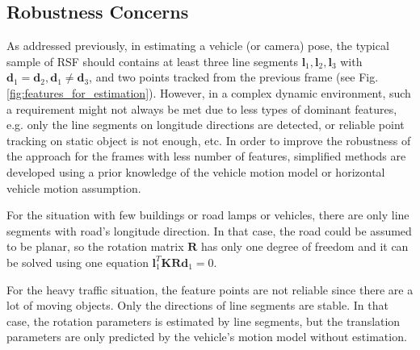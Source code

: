 \documentclass[letterpaper, 10 pt, conference]{ieeeconf}  %
\begin{document}
\subsection{Robustness Concerns}
As addressed previously, in estimating a vehicle (or camera) pose, the typical sample of RSF should contains at least three line segments $\mathbf{l}_1,\mathbf{l}_2,\mathbf{l}_3$ with $\mathbf{d}_1=\mathbf{d}_2,\mathbf{d}_1\neq \mathbf{d}_3$, and two points tracked from the previous frame (see Fig. \ref{fig:features_for_estimation}).
However, in a complex dynamic environment, such a requirement might not always be met due to less types of dominant features, e.g. only the line segments on longitude directions are detected, or reliable point tracking on static object is not enough, etc. In order to improve the robustness of the approach for the frames with less number of features, simplified methods are developed using a prior knowledge of the vehicle motion model or horizontal vehicle motion assumption.

For the situation with few buildings or road lamps or vehicles, there are only line segments with road's longitude direction. In that case, the road could be assumed to be planar, so the rotation matrix $\mathbf{R}$ has only one degree of freedom and it can be solved using one equation $\mathbf{l}_1^T\mathbf{K}\mathbf{R}\mathbf{d}_1=0$.


For the heavy traffic situation, the feature points are not reliable since there are a lot of moving objects. Only the directions of line segments are stable. In that case, the rotation parameters is estimated by line segments, but the translation parameters are only predicted by the vehicle's motion model without estimation.
\end{document}
